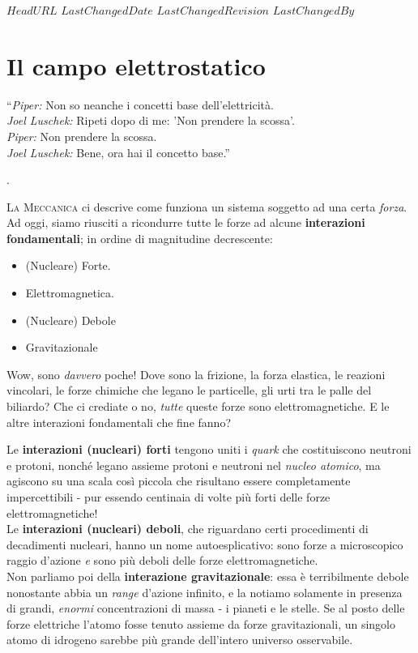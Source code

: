 \svnidlong
{$HeadURL$}
{$LastChangedDate$}
{$LastChangedRevision$}
{$LastChangedBy$}

\chapter{Il campo elettrostatico}%

\begin{introduction}
	``\emph{Piper:} Non so neanche i concetti base dell'elettricità.\\
	\emph{Joel Luschek:} Ripeti dopo di me: 'Non prendere la scossa'.\\
	\emph{Piper:} Non prendere la scossa.\\
	\emph{Joel Luschek:} Bene, ora hai il concetto base.''
\begin{flushright}
	.
\end{flushright}
\end{introduction}
\lettrine[findent=1pt, nindent=0pt]{L}{a Meccanica} ci descrive come funziona un sistema soggetto ad una certa \textit{forza}. Ad oggi, siamo riusciti a ricondurre tutte le forze ad alcune \textbf{interazioni fondamentali}; in ordine di magnitudine decrescente:
 \begin{itemize}
 	\item (Nucleare) Forte.
 	\item Elettromagnetica.
 	\item (Nucleare) Debole
 	\item Gravitazionale
 \end{itemize}
 Wow, sono \textit{davvero} poche! Dove sono la frizione, la forza elastica, le reazioni vincolari, le forze chimiche che legano le particelle, gli urti tra le palle del biliardo? Che ci crediate o no, \textit{tutte} queste forze sono elettromagnetiche. E le altre interazioni fondamentali che fine fanno?

Le \textbf{interazioni (nucleari) forti} tengono uniti i \textit{quark} che costituiscono neutroni e protoni, nonché legano assieme protoni e neutroni nel \textit{nucleo atomico}, ma agiscono su una scala così piccola che risultano essere completamente impercettibili - pur essendo centinaia di volte più forti delle forze elettromagnetiche!\\
Le \textbf{interazioni (nucleari) deboli}, che riguardano certi procedimenti di decadimenti nucleari, hanno un nome autoesplicativo: sono forze a microscopico raggio d'azione \textit{e} sono più deboli delle forze elettromagnetiche.\\
Non parliamo poi della \textbf{interazione gravitazionale}: essa è terribilmente debole nonostante abbia un \textit{range} d'azione infinito, e la notiamo solamente in presenza di grandi, \textit{enormi} concentrazioni di massa - i pianeti e le stelle. Se al posto delle forze elettriche l'atomo fosse tenuto assieme da forze gravitazionali, un singolo atomo di idrogeno sarebbe più grande dell'intero universo osservabile.


